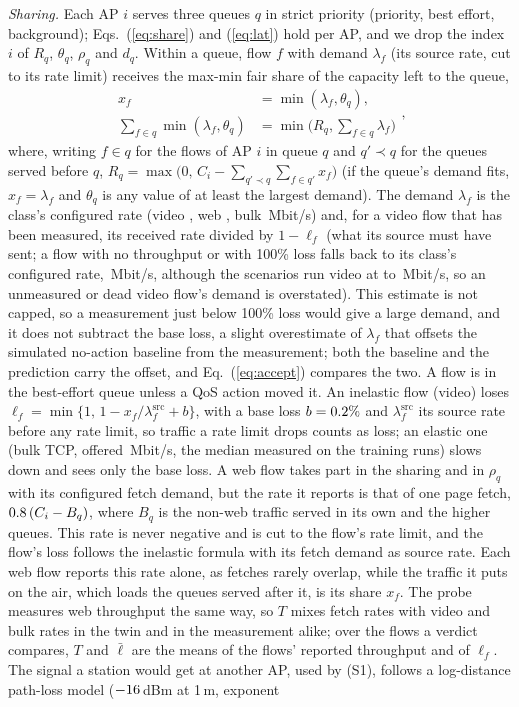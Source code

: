 \documentclass[conference]{IEEEtran}
\begin{document}
\emph{Sharing.} Each AP $i$ serves three queues $q$ in strict priority (priority, best effort, background); Eqs.~(\ref{eq:share}) and (\ref{eq:lat}) hold per AP, and we drop the index $i$ of $R_q$, $\theta_q$, $\rho_q$ and $d_q$. Within a queue, flow $f$ with demand $\lambda_f$ (its source rate, cut to its rate limit) receives the max-min fair share of the capacity left to the queue,
\begin{equation}
\boxed{\begin{aligned}
x_f&=\min(\lambda_f,\theta_q),\\
\textstyle\sum_{f\in q}\min(\lambda_f,\theta_q)&=\min\big(R_q,\textstyle\sum_{f\in q}\lambda_f\big)
\end{aligned}},
\label{eq:share}
\end{equation}
where, writing $f\in q$ for the flows of AP $i$ in queue $q$ and $q'\prec q$ for the queues served before $q$, $R_q=\max\big(0,\,C_i-\sum_{q'\prec q}\sum_{f\in q'}x_f\big)$ (if the queue's demand fits, $x_f=\lambda_f$ and $\theta_q$ is any value of at least the largest demand). The demand $\lambda_f$ is the class's configured rate (video \CfgVideo, web \CfgWebRate, bulk \CfgBulk\,Mbit/s) and, for a video flow that has been measured, its received rate divided by $1-\ell_f$ (what its source must have sent; a flow with no throughput or with 100\% loss falls back to its class's configured rate, \CfgVideo\,Mbit/s, although the scenarios run video at \ScenVideoFlash{} to \ScenVideoApFail\,Mbit/s, so an unmeasured or dead video flow's demand is overstated). This estimate is not capped, so a measurement just below 100\% loss would give a large demand, and it does not subtract the base loss, a slight overestimate of $\lambda_f$ that offsets the simulated no-action baseline from the measurement; both the baseline and the prediction carry the offset, and Eq.~(\ref{eq:accept}) compares the two. A flow is in the best-effort queue unless a QoS action moved it. An inelastic flow (video) loses $\ell_f=\min\{1,\,1-x_f/\lambda^{\mathrm{src}}_f+b\}$, with a base loss $b=0.2\%$ and $\lambda^{\mathrm{src}}_f$ its source rate before any rate limit, so traffic a rate limit drops counts as loss; an elastic one (bulk TCP, offered \CfgBulk\,Mbit/s, the median measured on the training runs) slows down and sees only the base loss. A web flow takes part in the sharing and in $\rho_q$ with its configured fetch demand, but the rate it reports is that of one page fetch, $0.8\,(C_i-B_q)$, where $B_q$ is the non-web traffic served in its own and the higher queues. This rate is never negative and is cut to the flow's rate limit, and the flow's loss follows the inelastic formula with its fetch demand as source rate. Each web flow reports this rate alone, as fetches rarely overlap, while the traffic it puts on the air, which loads the queues served after it, is its share $x_f$. The probe measures web throughput the same way, so $T$ mixes fetch rates with video and bulk rates in the twin and in the measurement alike; over the flows a verdict compares, $T$ and $\bar\ell$ are the means of the flows' reported throughput and of $\ell_f$. The signal a station would get at another AP, used by (S1), follows a log-distance path-loss model ($-16$\,dBm at 1\,m, exponent 
\end{document}
